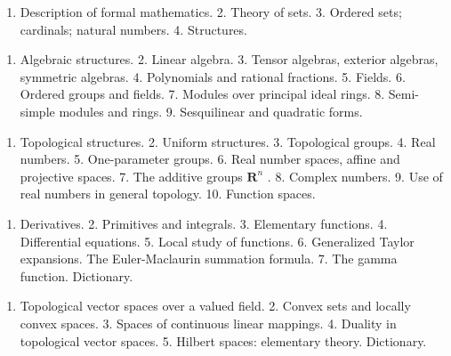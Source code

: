 

\begin{enumerate}
\def\labelenumi{\arabic{enumi}.}
\tightlist
\item
  Description of formal mathematics. 2. Theory of sets. 3. Ordered sets; cardinals; natural numbers. 4. Structures.
\end{enumerate}


\begin{enumerate}
\def\labelenumi{\arabic{enumi}.}
\tightlist
\item
  Algebraic structures. 2. Linear algebra. 3. Tensor algebras, exterior algebras, symmetric algebras. 4. Polynomials and rational fractions. 5. Fields. 6. Ordered groups and fields. 7. Modules over principal ideal rings. 8. Semi-simple modules and rings. 9. Sesquilinear and quadratic forms.
\end{enumerate}


\begin{enumerate}
\def\labelenumi{\arabic{enumi}.}
\tightlist
\item
  Topological structures. 2. Uniform structures. 3. Topological groups. 4. Real numbers. 5. One-parameter groups. 6. Real number spaces, affine and projective spaces. 7. The additive groups \(\mathbf{R}^n\) . 8. Complex numbers. 9. Use of real numbers in general topology. 10. Function spaces.
\end{enumerate}


\begin{enumerate}
\def\labelenumi{\arabic{enumi}.}
\tightlist
\item
  Derivatives. 2. Primitives and integrals. 3. Elementary functions. 4. Differential equations. 5. Local study of functions. 6. Generalized Taylor expansions. The Euler-Maclaurin summation formula. 7. The gamma function. Dictionary.
\end{enumerate}


\begin{enumerate}
\def\labelenumi{\arabic{enumi}.}
\tightlist
\item
  Topological vector spaces over a valued field. 2. Convex sets and locally convex spaces. 3. Spaces of continuous linear mappings. 4. Duality in topological vector spaces. 5. Hilbert spaces: elementary theory. Dictionary.
\end{enumerate}

